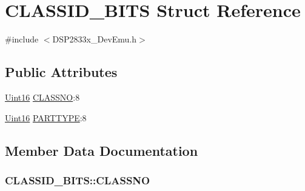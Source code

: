 \hypertarget{struct_c_l_a_s_s_i_d___b_i_t_s}{}\section{C\+L\+A\+S\+S\+I\+D\+\_\+\+B\+I\+T\+S Struct Reference}
\label{struct_c_l_a_s_s_i_d___b_i_t_s}


{\ttfamily \#include $<$D\+S\+P2833x\+\_\+\+Dev\+Emu.\+h$>$}

\subsection*{Public Attributes}
\begin{DoxyCompactItemize}
\item 
\hyperlink{_d_s_p2833x___device_8h_a59a9f6be4562c327cbfb4f7e8e18f08b}{Uint16} \hyperlink{struct_c_l_a_s_s_i_d___b_i_t_s_a670b6a7265cf7c6fc73b34b10238f44a}{C\+L\+A\+S\+S\+N\+O}\+:8
\item 
\hyperlink{_d_s_p2833x___device_8h_a59a9f6be4562c327cbfb4f7e8e18f08b}{Uint16} \hyperlink{struct_c_l_a_s_s_i_d___b_i_t_s_a247e66d573cba33b18a80365f31f0d33}{P\+A\+R\+T\+T\+Y\+P\+E}\+:8
\end{DoxyCompactItemize}


\subsection{Member Data Documentation}
\hypertarget{struct_c_l_a_s_s_i_d___b_i_t_s_a670b6a7265cf7c6fc73b34b10238f44a}{}
\subsubsection[{C\+L\+A\+S\+S\+N\+O}]{ C\+L\+A\+S\+S\+I\+D\+\_\+\+B\+I\+T\+S\+::\+C\+L\+A\+S\+S\+N\+O}\label{struct_c_l_a_s_s_i_d___b_i_t_s_a670b6a7265cf7c6fc73b34b10238f44a}
\hypertarget{struct_c_l_a_s_s_i_d___b_i_t_s_a247e66d573cba33b18a80365f31f0d33}{}
